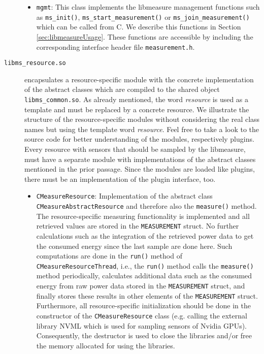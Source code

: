 \begin{description}
\begin{itemize}
		\item \texttt{mgmt}: This class implements the libmeasure management functions such as \texttt{ms\_init()}, \texttt{ms\_start\_measurement()} or \texttt{ms\_join\_measurement()} which can be called from C. We describe this functions in Section \ref{sec:libmeasureUsage}. These functions are accessible by including the corresponding interface header file \texttt{measurement.h}.
	\end{itemize}
	
	\item[\texttt{libms\_resource.so}] encapsulates a resource-specific module with the concrete implementation of the abstract classes which are compiled to the shared object \texttt{libms\_common.so}. As already mentioned, the word \textit{resource} is used as a template and must be replaced by a concrete resource. We  illustrate the structure of the resource-specific modules without considering the real class names but using the template word \textit{resource}. Feel free to take a look to the source code for better understanding of the modules, respectively plugins.\\
	Every resource with sensors that should be sampled by the libmeasure, must have a separate module with implementations of the abstract classes mentioned in the prior passage. Since the modules are loaded like plugins, there must be an implementation of the plugin interface, too.
	\begin{itemize}
		\item \texttt{CMeasureResource}: Implementation of the abstract class\\\texttt{CMeasureAbstractResource} and therefore also the \texttt{measure()} method. The resource-specific measuring functionality is implemented and all retrieved values are stored in the \texttt{MEASUREMENT} struct. No further calculations such as the integration of the retrieved power data to get the consumed energy since the last sample are done here. Such computations are done in the \texttt{run()} method of \texttt{CMeasureResourceThread}, i.e., the \texttt{run()} method calls the \texttt{measure()} method periodically, calculates additional data such as the consumed energy from raw power data stored in the \texttt{MEASUREMENT} struct, and finally stores these results in other elements of the \texttt{MEASUREMENT} struct. Furthermore, all resource-specific initialization should be done in the constructor of the \texttt{CMeasureResource} class (e.g. calling the external library NVML which is used for sampling sensors of Nvidia GPUs). Consequently, the destructor is used to close the libraries and/or free the memory allocated for using the libraries.  
		

\end{itemize}
\end{description}
